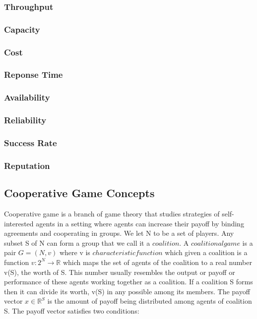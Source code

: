 \documentclass[10pt, conference, compsocconf]{IEEEtran}
\theoremstyle{plain}
\theoremstyle{definition}
\begin{document}
\subsubsection{Throughput}
\subsubsection{Capacity}
\subsubsection{Cost}
\subsubsection{Reponse Time}
\subsubsection{Availability}
\subsubsection{Reliability}
\subsubsection{Success Rate}
\subsubsection{Reputation}


\subsection{Cooperative Game Concepts}
Cooperative game is a branch of game theory that studies strategies of self-interested agents in a setting where agents can increase their payoff by binding agreements and cooperating in groups. We let N to be a set of players. Any subset S of N can form a group that we call it a $coalition$. A $coalitional game$ is a pair $G = (N, v)$ where v is $characteristic function$ which given a coalition is a function $v: 2^N \to \mathbb{R}$ which maps the set of agents of the coalition to a real number v(S), the worth of S. This number usually resembles the output or payoff or performance of these agents working together as a coalition.  If a coalition S forms then it can divide its worth, v(S) in any possible among its members. The payoff vector $x \in \mathbb{R}^S$ is the amount of payoff being distributed among agents of coalition S. The payoff vector satisfies two conditions:
\end{document}
